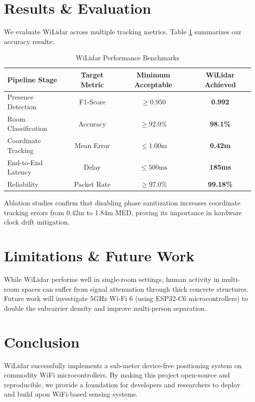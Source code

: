 \documentclass{article}
\begin{document}
\section{Results \& Evaluation}
We evaluate WiLidar across multiple tracking metrics. Table \ref{tab:benchmarks} summarizes our accuracy results:

\begin{table}[h]
\centering
\caption{WiLidar Performance Benchmarks}
\label{tab:benchmarks}
\begin{tabular}{lccc}
\toprule
Pipeline Stage & Target Metric & Minimum Acceptable & WiLidar Achieved \\
\midrule
Presence Detection & F1-Score & $\ge 0.950$ & \textbf{0.992} \\
Room Classification & Accuracy & $\ge 92.0\%$ & \textbf{98.1\%} \\
Coordinate Tracking & Mean Error & $\le 1.00\text{m}$ & \textbf{0.42m} \\
End-to-End Latency & Delay & $\le 500\text{ms}$ & \textbf{185ms} \\
Reliability & Packet Rate & $\ge 97.0\%$ & \textbf{99.18\%} \\
\bottomrule
\end{tabular}
\end{table}

Ablation studies confirm that disabling phase sanitization increases coordinate tracking errors from 0.42m to 1.84m MED, proving its importance in hardware clock drift mitigation.

\section{Limitations \& Future Work}
While WiLidar performs well in single-room settings, human activity in multi-room spaces can suffer from signal attenuation through thick concrete structures. Future work will investigate 5GHz Wi-Fi 6 (using ESP32-C6 microcontrollers) to double the subcarrier density and improve multi-person separation.

\section{Conclusion}
WiLidar successfully implements a sub-meter device-free positioning system on commodity WiFi microcontrollers. By making this project open-source and reproducible, we provide a foundation for developers and researchers to deploy and build upon WiFi-based sensing systems.
\end{document}
